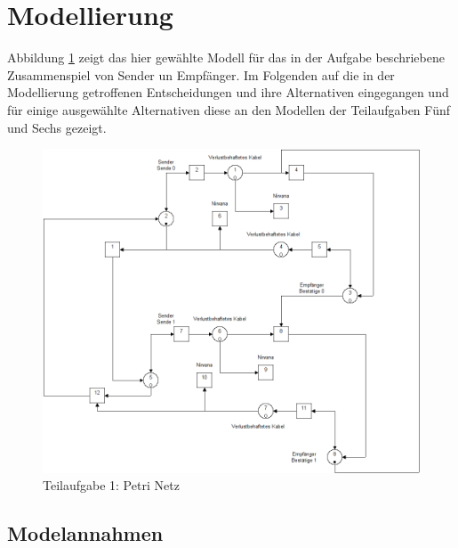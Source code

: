 \documentclass[10pt]{scrartcl}
\author{André Harms, Oliver Steenbuck}
\title{\titletext}
\date{04.04.2012}
\begin{document}
\maketitle

\setcounter{tocdepth}{3}
\tableofcontents

	\listoffigures  
	\lstlistoflistings	

\section{Modellierung}
	Abbildung \ref{img:aufg1} zeigt das hier gewählte Modell für das in der Aufgabe beschriebene Zusammenspiel von Sender un Empfänger. Im Folgenden auf die in der Modellierung getroffenen Entscheidungen und ihre Alternativen eingegangen und für einige ausgewählte Alternativen diese an den Modellen der Teilaufgaben Fünf und Sechs gezeigt.
	  
	\begin{figure}[H]		
        \includegraphics[scale=0.5]{praktikum1-aufgabe1.png}
        \caption{Teilaufgabe 1: Petri Netz} 
        \label{img:aufg1}
	\end{figure}
	
\subsection{Modelannahmen}
\end{document}
